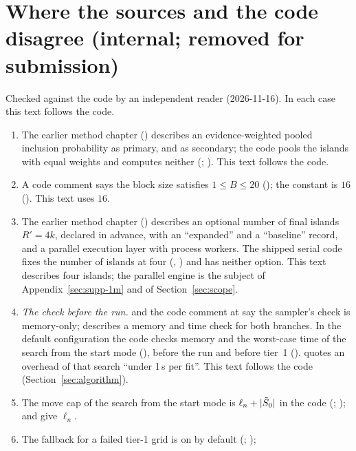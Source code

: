 \section{Where the sources and the code disagree (internal; removed for submission)}\label{app:disagree}
Checked against the code by an independent reader (2026-11-16). In each case this text follows the code.
\begin{enumerate}[leftmargin=1.8em]
  \item The earlier method chapter () describes an
    evidence-weighted pooled inclusion probability as primary, and  as
    secondary; the code pools the islands with equal weights and computes neither (;
    ). This text follows the code.
  \item A code comment says the block size satisfies $1\le B\le20$ (); the constant is $16$
    (). This text uses $16$.
  \item The earlier method chapter () describes an optional
    number of final islands $R'=4k$, declared in advance, with an ``expanded'' and a ``baseline'' record, and a parallel
    execution layer with process workers. The shipped serial code fixes the number of islands at four
    (, ) and has neither option. This text describes four islands; the parallel
    engine is the subject of Appendix~\ref{sec:supp-1m} and of Section~\ref{sec:scope}.
  \item \emph{The check before the run.}  and the code comment at  say the
    sampler's check is memory-only;  describes a memory and time check for both
    branches. In the default configuration the code checks memory and the worst-case time of the search from the start
    mode (), before the run and before tier~1 (). 
    quotes an overhead of that search ``under 1\,s per fit''. This text follows the code (Section~\ref{sec:algorithm}).
  \item The move cap of the search from the start mode is $\ell_n+\lvert \tilde S_0\rvert$ in the code (;
    );  and  give $\ell_n$.
  \item The fallback for a failed tier-1 grid is on by default (; );

\end{enumerate}
